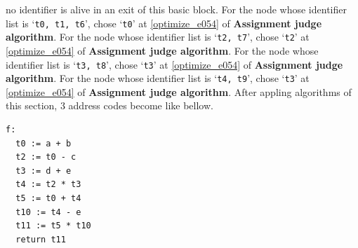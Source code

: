 \begin{Example}
no identifier is alive in an exit of this basic block.
For the node whose identifier list is `{\tt{t0, t1, t6}}',
chose `{\tt{t0}}' at \ref{optimize_e054}
of {\bf Assignment judge algorithm}.
For the node whose identifier list is `{\tt{t2, t7}}',
chose `{\tt{t2}}' at \ref{optimize_e054}
of {\bf Assignment judge algorithm}.
For the node whose identifier list is `{\tt{t3, t8}}',
chose `{\tt{t3}}' at \ref{optimize_e054}
of {\bf Assignment judge algorithm}.
For the node whose identifier list is `{\tt{t4, t9}}',
chose `{\tt{t3}}' at \ref{optimize_e054}
of {\bf Assignment judge algorithm}.
After appling algorithms of this section,
3 address codes become like bellow.
\begin{verbatim}
f:
  t0 := a + b
  t2 := t0 - c
  t3 := d + e
  t4 := t2 * t3
  t5 := t0 + t4
  t10 := t4 - e
  t11 := t5 * t10
  return t11
\end{verbatim}
\end{Example}

